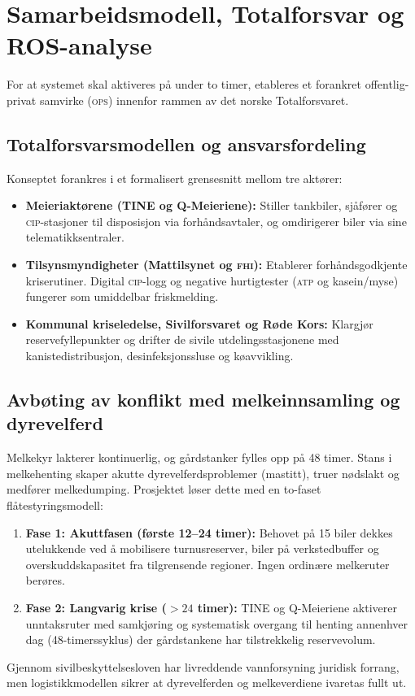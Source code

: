 \section{Samarbeidsmodell, Totalforsvar og ROS-analyse}
\label{sec:totalforsvar}

For at systemet skal aktiveres på under to timer, etableres et forankret offentlig-privat samvirke (\textsc{ops}) innenfor rammen av det norske Totalforsvaret.

\subsection{Totalforsvarsmodellen og ansvarsfordeling}
Konseptet forankres i et formalisert grensesnitt mellom tre aktører:
\begin{itemize}[leftmargin=1.5em, itemsep=0.2em]
    \item \textbf{Meieriaktørene (TINE og Q-Meieriene):} Stiller tankbiler, sjåfører og \textsc{cip}-stasjoner til disposisjon via forhåndsavtaler, og omdirigerer biler via sine telematikksentraler.
    \item \textbf{Tilsynsmyndigheter (Mattilsynet og \textsc{fhi}):} Etablerer forhåndsgodkjente kriserutiner. Digital \textsc{cip}-logg og negative hurtigtester (\textsc{atp} og kasein/myse) fungerer som umiddelbar friskmelding.
    \item \textbf{Kommunal kriseledelse, Sivilforsvaret og Røde Kors:} Klargjør reservefyllepunkter og drifter de sivile utdelingsstasjonene med kanistedistribusjon, desinfeksjonssluse og køavvikling.
\end{itemize}

\subsection{Avbøting av konflikt med melkeinnsamling og dyrevelferd}
Melkekyr lakterer kontinuerlig, og gårdstanker fylles opp på 48 timer. Stans i melkehenting skaper akutte dyrevelferdsproblemer (mastitt), truer nødslakt og medfører melkedumping. Prosjektet løser dette med en to-faset flåtestyringsmodell:
\begin{enumerate}[leftmargin=1.5em, itemsep=0.15em]
    \item \textbf{Fase 1: Akuttfasen (første 12--24 timer):} Behovet på 15 biler dekkes utelukkende ved å mobilisere turnusreserver, biler på verkstedbuffer og overskuddskapasitet fra tilgrensende regioner. Ingen ordinære melkeruter berøres.
    \item \textbf{Fase 2: Langvarig krise ($> 24$ timer):} TINE og Q-Meieriene aktiverer unntaksruter med samkjøring og systematisk overgang til henting annenhver dag (48-timerssyklus) der gårdstankene har tilstrekkelig reservevolum.
\end{enumerate}
Gjennom sivilbeskyttelsesloven har livreddende vannforsyning juridisk forrang, men logistikkmodellen sikrer at dyrevelferden og melkeverdiene ivaretas fullt ut.

